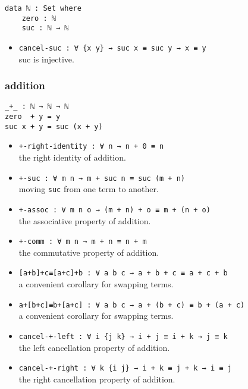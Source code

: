 \documentclass[../thesis.tex]{subfiles}
\begin{document}
\begin{lstlisting}
data ℕ : Set where
    zero : ℕ
    suc : ℕ → ℕ
\end{lstlisting}

\begin{itemize}
    \item {\lstinline|cancel-suc : ∀ {x y} → suc x ≡ suc y → x ≡ y|}
        \\ suc is injective.
\end{itemize}

\subsubsection{addition}

\begin{lstlisting}
_+_ : ℕ → ℕ → ℕ
zero  + y = y
suc x + y = suc (x + y)
\end{lstlisting}

\begin{itemize}
    \item {\lstinline|+-right-identity : ∀ n → n + 0 ≡ n|}
        \\ the right identity of addition.
    \item {\lstinline|+-suc : ∀ m n → m + suc n ≡ suc (m + n)|}
        \\ moving {\lstinline|suc|} from one term to another.
    \item {\lstinline|+-assoc : ∀ m n o → (m + n) + o ≡ m + (n + o)|}
        \\ the associative property of addition.
    \item {\lstinline|+-comm : ∀ m n → m + n ≡ n + m|}
        \\ the commutative property of addition.
    \item {\lstinline|[a+b]+c≡[a+c]+b : ∀ a b c → a + b + c ≡ a + c + b|}
        \\ a convenient corollary for swapping terms.
    \item {\lstinline|a+[b+c]≡b+[a+c] : ∀ a b c → a + (b + c) ≡ b + (a + c)|}
        \\ a convenient corollary for swapping terms.
    \item {\lstinline|cancel-+-left : ∀ i {j k} → i + j ≡ i + k → j ≡ k|}
        \\ the left cancellation property of addition.
    \item {\lstinline|cancel-+-right : ∀ k {i j} → i + k ≡ j + k → i ≡ j|}
        \\ the right cancellation property of addition.
\end{itemize}
\end{document}
